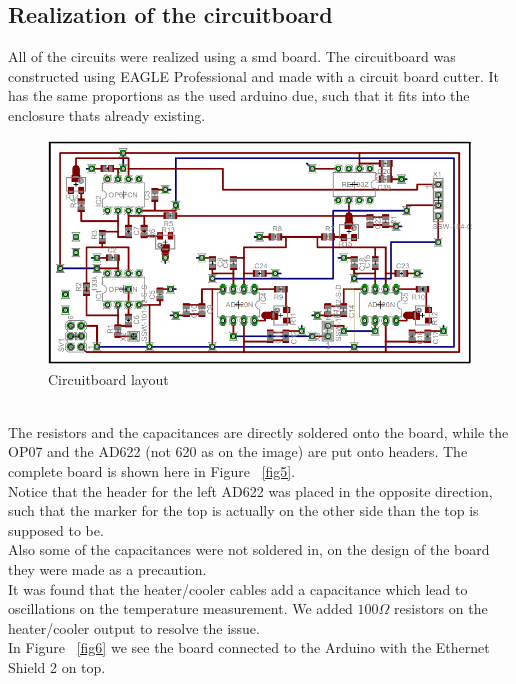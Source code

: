 \documentclass[12pt]{scrartcl}
\begin{document}
    \subsection{Realization of the circuitboard}
      All of the circuits were realized using a smd board. The circuitboard was
      constructed using EAGLE Professional and made with a circuit board cutter.
      It has the same proportions as the used arduino due, such that it fits
      into the enclosure thats already existing.
      \begin{figure}[h]
        \includegraphics[width = \textwidth]{board.png}
        \caption{Circuitboard layout}
        \label{fig4}
      \end{figure}
      \\The resistors and the capacitances are directly soldered onto the board,
      while the OP07 and the AD622 (not 620 as on the image) are put onto
      headers. The complete board is shown here in Figure~ \ref{fig5}.
      \\ Notice that the header for the left AD622 was placed in the opposite
      direction, such that the marker for the top is actually on the other side
      than the top is supposed to be.\\
      Also some of the capacitances were not soldered in, on the design of the
      board they were made as a precaution.\\
      It was found that the heater/cooler cables add a capacitance which lead
      to oscillations on the temperature measurement. We added $100 \Omega$
      resistors on the heater/cooler output to resolve the issue.\\ In Figure~
      \ref{fig6} we see the board connected to the Arduino with the Ethernet
      Shield 2 on top.\\
\end{document}
